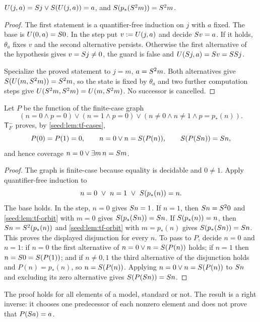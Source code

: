 \begin{lemma}\label{seed:lem:tf-orbit}
$U(j,a)=S j\lor S(U(j,a))=a$, and $S(p_*(S^2m))=S^2m$.
\end{lemma}

\begin{proof}
The first statement is a quantifier-free induction on $j$ with $a$ fixed.
The base is $U(0,a)=S 0$. In the step put $v\mathrel{:=} U(j,a)$ and decide
$S v=a$. If it holds, $\theta_a$ fixes $v$ and the second alternative
persists. Otherwise the first alternative of the hypothesis gives
$v=S j\neq0$, the guard is false and $U(S j,a)=S v=SS j$.

Specialize the proved statement to $j=m$, $a=S^2m$. Both alternatives
give $S(U(m,S^2m))=S^2m$, so the state is fixed by $\theta_a$ and
two further computation steps give $U(S^2m,S^2m)=U(m,S^2m)$. No
successor is cancelled.
\end{proof}

\begin{theorem}\label{seed:thm:tf-coverage}
Let $P$ be the function of the finite-case graph
\[
 (n=0\land p=0)\lor(n=1\land p=0)\lor(n\neq0\land n\neq1\land p=p_*(n)).
\]
$\mathsf{T}_F^{-}$ proves, by \cref{seed:lem:tf-cases},
\[
 P(0)=P(1)=0,\qquad n=0\lor n=S(P(n)),\qquad S(P(S n))=S n,
\]
and hence coverage $n=0\lor\exists m\,n=S m$.
\end{theorem}

\begin{proof}
The graph is finite-case because equality is decidable and $0\neq1$. Apply
quantifier-free induction to
\[
 n=0\ \lor\ n=1\ \lor\ \Suc(p_*(n))=n .
\]
The base holds. In the step, $n=0$ gives $S n=1$. If $n=1$, then
$S n=S^20$ and \cref{seed:lem:tf-orbit} with $m=0$ gives
$S(p_*(S n))=S n$. If $S(p_*(n))=n$, then
$S n=S^2(p_*(n))$ and \cref{seed:lem:tf-orbit} with $m=p_*(n)$ gives
$S(p_*(S n))=S n$. This proves the displayed disjunction for every
$n$. To pass to $P$, decide $n=0$ and $n=1$: if $n=0$ the first alternative
of $n=0\lor n=S(P(n))$ holds; if $n=1$ then $n=S 0=S(P(1))$; and if
$n\neq0,1$ the third alternative of the disjunction holds and
$P(n)=p_*(n)$, so $n=S(P(n))$. Applying $n=0\lor n=S(P(n))$ to
$S n$ and excluding its zero alternative gives
$S(P(S n))=S n$.
\end{proof}

The proof holds for all elements of a model, standard or not. The result is
a right inverse: it chooses one predecessor of each nonzero element and does
not prove that $P(S a)=a$.

